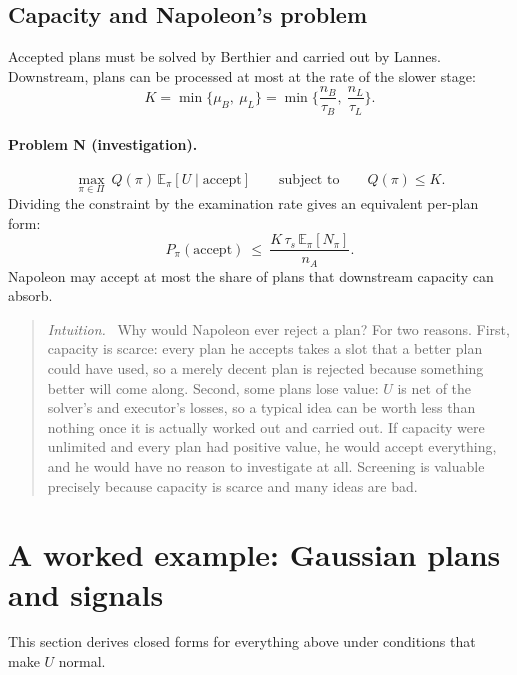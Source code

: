 \documentclass[11pt]{article}
\newcommand{\Nap}{\textcolor{nap}{Napoleon}}
\newcommand{\Ber}{\textcolor{ber}{Berthier}}
\newcommand{\Lan}{\textcolor{lan}{Lannes}}
\theoremstyle{remark}
\newenvironment{intuition}{\begin{quote}\small\color{muted}\textit{Intuition.}\ }{\end{quote}}
\newcommand{\E}{\mathbb{E}}
\newcommand{\accept}{\text{accept}}
\begin{document}
\subsection{\texorpdfstring{Capacity and \Nap's problem}{Capacity and Napoleon's problem}}

Accepted plans must be solved by \Ber{} and carried out by \Lan. Downstream, plans can be processed at most at the rate of the slower stage:
\begin{equation}\label{eq:K}
K=\min\{\mu_B,\ \mu_L\}=\min\Big\{\frac{n_B}{\tau_B},\ \frac{n_L}{\tau_L}\Big\}.
\end{equation}

\paragraph{Problem N (investigation).}
\begin{equation}\label{eq:problemN}
\max_{\pi\in\Pi}\ Q(\pi)\,\E_\pi[U\mid\accept]\qquad\text{subject to}\qquad Q(\pi)\le K.
\end{equation}
Dividing the constraint by the examination rate gives an equivalent per-plan form:
\[
P_\pi(\accept)\ \le\ \frac{K\,\tau_s\,\E_\pi[N_\pi]}{n_A}.
\]
\Nap{} may accept at most the share of plans that downstream capacity can absorb.

\begin{intuition}
Why would \Nap{} ever reject a plan? For two reasons. First, capacity is scarce: every plan he accepts takes a slot that a better plan could have used, so a merely decent plan is rejected because something better will come along. Second, some plans lose value: $U$ is net of the solver's and executor's losses, so a typical idea can be worth less than nothing once it is actually worked out and carried out. If capacity were unlimited and every plan had positive value, he would accept everything, and he would have no reason to investigate at all. Screening is valuable precisely because capacity is scarce and many ideas are bad.
\end{intuition}

\section{A worked example: Gaussian plans and signals}\label{sec:gauss}

This section derives closed forms for everything above under conditions that make $U$ normal.
\end{document}
